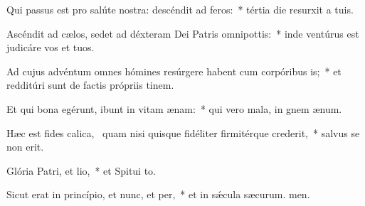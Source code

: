 \item Qui passus est pro salúte nostra: descéndit ad feros:~* tértia die resurxit a tuis.
\item Ascéndit ad cælos, sedet ad déxteram Dei Patris omnipottis:~* inde ventúrus est judicáre vos et tuos.
\item Ad cujus advéntum omnes hómines resúrgere habent cum corpóribus is;~* et redditúri sunt de factis própriis tinem.
\item Et qui bona egérunt, ibunt in vitam ænam:~* qui vero mala, in gnem ænum.
\item Hæc est fides calica,~\pscross{} quam nisi quisque fidéliter firmitérque crederit,~* salvus se non erit.
\item Glória Patri, et lio,~* et Spitui to.
\item Sicut erat in princípio, et nunc, et per,~* et in sǽcula sæcurum. men.
